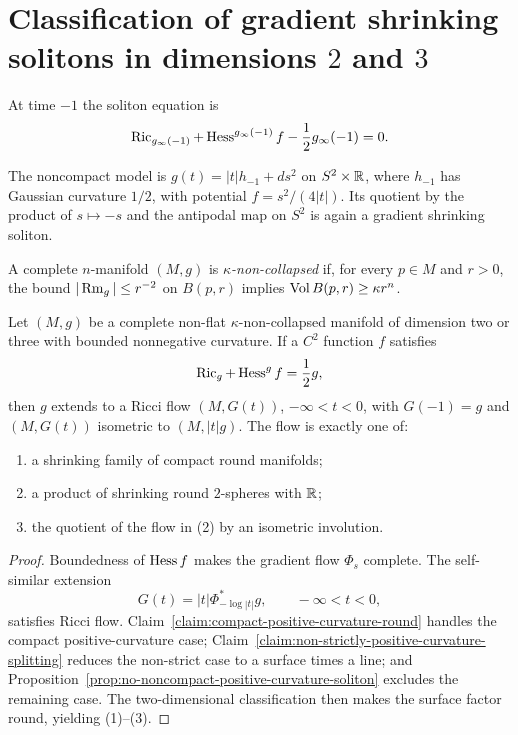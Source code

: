 \section{Classification of gradient shrinking solitons in dimensions $2$ and $3$}

At time $-1$ the soliton equation is
\begin{equation}\label{GSS-1}
 \operatorname{Ric}_{g_\infty(-1)}+\operatorname{Hess}^{g_\infty(-1)}f
 -\frac12g_\infty(-1)=0.
\end{equation}

The noncompact model is
$g(t)=|t|h_{-1}+ds^2$ on $S^2\times\mathbb{R}$, where $h_{-1}$ has
Gaussian curvature $1/2$, with potential $f=s^2/(4|t|)$. Its
quotient by the product of $s\mapsto-s$ and the antipodal map on
$S^2$ is again a gradient shrinking soliton.

\begin{definition}\label{def:kappa-noncollapsed-riemannian-manifold}

A complete $n$-manifold $(M,g)$ is \emph{$\kappa$-non-collapsed}
if, for every $p\in M$ and $r>0$, the bound
$|\operatorname{Rm}_g|\leq r^{-2}$ on $B(p,r)$ implies
$\operatorname{Vol} B(p,r)\geq\kappa r^n$.
\end{definition}

\begin{theorem}\label{thm:gradient-shrinking-soliton-classification}
\label{GSSclass}

Let $(M,g)$ be a complete non-flat $\kappa$-non-collapsed manifold
of dimension two or three with bounded nonnegative curvature. If a
$C^2$ function $f$ satisfies
\[
 \operatorname{Ric}_g+\operatorname{Hess}^g f=\frac12g,
\]
then $g$ extends to a Ricci flow $(M,G(t))$, $-\infty<t<0$, with
$G(-1)=g$ and $(M,G(t))$ isometric to $(M,|t|g)$. The flow is exactly
one of:
\begin{enumerate}
\item[(1)] a shrinking family of compact round manifolds;
\item[(2)] a product of shrinking round $2$-spheres with $\mathbb{R}$;
\item[(3)] the quotient of the flow in (2) by an isometric involution.
\end{enumerate}
\end{theorem}
\begin{proof}
\sketch Boundedness of $\operatorname{Hess} f$ makes the gradient flow $\Phi_s$
complete. The self-similar extension
\begin{equation}\label{Gdefn}
 G(t)=|t|\Phi_{-\log|t|}^*g,\qquad -\infty<t<0,
\end{equation}
satisfies Ricci flow. Claim~\ref{claim:compact-positive-curvature-round}
handles the compact positive-curvature case;
Claim~\ref{claim:non-strictly-positive-curvature-splitting} reduces
the non-strict case to a surface times a line; and
Proposition~\ref{prop:no-noncompact-positive-curvature-soliton}
excludes the remaining case. The two-dimensional classification
then makes the surface factor round, yielding (1)--(3).
\end{proof}

